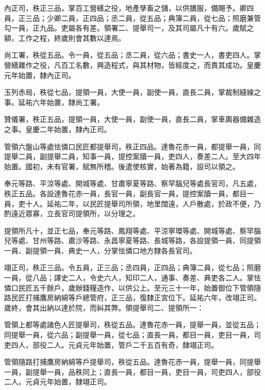 \begin{pinyinscope}
 內正司，秩正三品，掌百工營繕之役，地產孳畜之儲，以供膳服，備賜予。卿四員，正三品；少卿二員，正四品；丞二員，從五品；典簿二員，從七品；照磨兼管勾一員，正九品。吏屬各有差。領署二、提舉司一，及其司屬凡十有六。歲賦之額，工作之程，終歲則會其數以達焉。



 尚工署，秩從五品。令一員，從五品；丞二員，從六品；書史一人，書吏四人。掌營繕雜作之役，凡百工名數，興造程式，與其材物，皆經度之，而責其成功。皇慶元年始置，隸內正司。



 玉列赤局，秩從七品，提領一員，大使一員，副使一員，直長二員，掌裁制縫線之事。延祐六年始置，隸尚工署。



 贊儀署，秩正五品，提領一員，大使一員，副使一員，直長二員，掌車輿器備雜造之事。皇慶二年始置，隸內正司。



 管領六盤山等處怯憐口民匠都提舉司，秩正四品。達魯花赤一員，都提舉一員，同提舉二員，副提舉二員，知事一員，提控案牘一員，吏四人，奏差二人。至大四年始置。國初，未有官署，賦無所稽。後遣使核實，始著為籍，設司以領之。



 奉元等路、平涼等處、開城等處、甘肅寧夏等路、察罕腦兒等處長官司，凡五處，秩正五品。各設達魯花赤一員，長官一員，副長官一員，提控案牘一員，都目一員，吏十人。延祐二年，以民匠提舉司所領，地里闊遠，人戶散處，於政不便，乃酌遠近眾寡，立長官司提領所，以分理之。



 提領所凡十，並正七品，奉元等路、鳳翔等處、平涼寧環等處、開城等處、察罕腦兒等處、甘州等路、肅沙等路、永昌寧夏等路、長城等路，各設提領一員、同提領一員、副提領一員、典史一人，分掌怯憐口地方隸各長官司。



 翊正司，秩正三品。令五員，正三品；丞四員，正四品；典簿二員，從七品；照磨一員，從八品；譯史二人，令史六人，知印二人，通事、奏差、典吏各二人。掌怯憐口民匠五千餘戶，歲辦錢糧造作，以供公上。至元三十一年，始置御位下管領隨路民匠打捕鷹房納綿等戶總管府，正三品，復隸正宮位下。延祐六年，改翊正司。歲終，會其出納以達於院，而糾其弊。領提舉司二、提領所一：



 管領上都等處諸色人匠提舉司，秩從五品。達魯花赤一員，提舉一員，並從五品；同提舉一員，從六品；副提舉一員，從七品；直長一員，都目一員，吏目一員，司吏四人，部役二人。元貞元年始置，管戶二千五百有奇，隸翊正司。



 管領隨路打捕鷹房納綿等戶提舉司，秩從五品。達魯花赤一員，提舉一員，同提舉一員，副提舉一員，品秩同上；直長一員，都目一員，吏目一員，司吏四人，部役二人。元貞元年始置，隸翊正司。




\end{pinyinscope}
